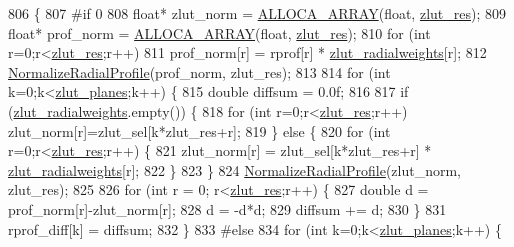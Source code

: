 \begin{DoxyCode}
806 \{
807 \textcolor{preprocessor}{#if 0}
808     \textcolor{keywordtype}{float}* zlut\_norm = \hyperlink{std__incl_8h_a37dbccb865134ee3a70c5044b365ded7}{ALLOCA\_ARRAY}(\textcolor{keywordtype}{float}, \hyperlink{class_c_p_u_tracker_a058eae282c9bf847cd8e39664688c5bc}{zlut\_res});
809     \textcolor{keywordtype}{float}* prof\_norm = \hyperlink{std__incl_8h_a37dbccb865134ee3a70c5044b365ded7}{ALLOCA\_ARRAY}(\textcolor{keywordtype}{float}, \hyperlink{class_c_p_u_tracker_a058eae282c9bf847cd8e39664688c5bc}{zlut\_res});
810     \textcolor{keywordflow}{for} (\textcolor{keywordtype}{int} r=0;r<\hyperlink{class_c_p_u_tracker_a058eae282c9bf847cd8e39664688c5bc}{zlut\_res};r++)
811         prof\_norm[r] = rprof[r] * \hyperlink{class_c_p_u_tracker_a0512849e34777963ac4d380682f804a3}{zlut\_radialweights}[r];
812     \hyperlink{utils_8cpp_a404fa660440d30ed70566aebf9f9e94a}{NormalizeRadialProfile}(prof\_norm, zlut\_res);
813 
814     \textcolor{keywordflow}{for} (\textcolor{keywordtype}{int} k=0;k<\hyperlink{class_c_p_u_tracker_ad28d60ad587ae3f89b9dba7f82c135f7}{zlut\_planes};k++) \{
815         \textcolor{keywordtype}{double} diffsum = 0.0f;
816 
817         \textcolor{keywordflow}{if} (\hyperlink{class_c_p_u_tracker_a0512849e34777963ac4d380682f804a3}{zlut\_radialweights}.empty()) \{
818             \textcolor{keywordflow}{for} (\textcolor{keywordtype}{int} r=0;r<\hyperlink{class_c_p_u_tracker_a058eae282c9bf847cd8e39664688c5bc}{zlut\_res};r++)  zlut\_norm[r]=zlut\_sel[k*zlut\_res+r];
819         \} \textcolor{keywordflow}{else} \{
820             \textcolor{keywordflow}{for} (\textcolor{keywordtype}{int} r=0;r<\hyperlink{class_c_p_u_tracker_a058eae282c9bf847cd8e39664688c5bc}{zlut\_res};r++) \{
821                 zlut\_norm[r] = zlut\_sel[k*zlut\_res+r] * \hyperlink{class_c_p_u_tracker_a0512849e34777963ac4d380682f804a3}{zlut\_radialweights}[r];
822             \}
823         \}
824         \hyperlink{utils_8cpp_a404fa660440d30ed70566aebf9f9e94a}{NormalizeRadialProfile}(zlut\_norm, zlut\_res);
825 
826         \textcolor{keywordflow}{for} (\textcolor{keywordtype}{int} r = 0; r<\hyperlink{class_c_p_u_tracker_a058eae282c9bf847cd8e39664688c5bc}{zlut\_res};r++) \{
827             \textcolor{keywordtype}{double} d = prof\_norm[r]-zlut\_norm[r];
828             d = -d*d;
829             diffsum += d;
830         \}
831         rprof\_diff[k] = diffsum;
832     \}
833 \textcolor{preprocessor}{#else}
834     \textcolor{keywordflow}{for} (\textcolor{keywordtype}{int} k=0;k<\hyperlink{class_c_p_u_tracker_ad28d60ad587ae3f89b9dba7f82c135f7}{zlut\_planes};k++) \{

\end{DoxyCode}
